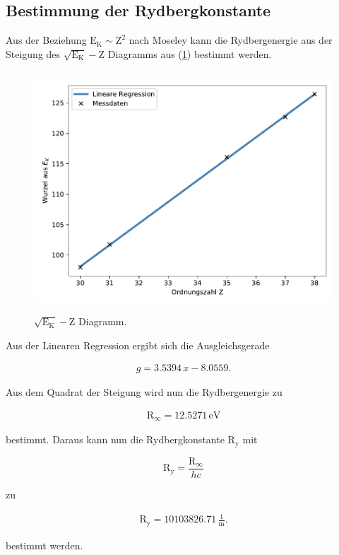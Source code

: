 \subsection{Bestimmung der Rydbergkonstante}    

\noindent
Aus der Beziehung $\text{E}_\text{K} \sim \text{Z}^2$ nach Moseley
kann die Rydbergenergie aus der Steigung des $ \sqrt{\text{E}_\text{K}}-\text{Z}$ Diagramms aus (\ref{fig:mose}) bestimmt werden.

\begin{figure}
    \centering
       \includegraphics[height=9cm]{daten/mose.pdf}
       \caption{$\sqrt{\text{E}_\text{K}}-\text{Z}$ Diagramm.}
       \label{fig:mose}
\end{figure}

\noindent
Aus der Linearen Regression ergibt sich die Ausgleichsgerade

\begin{align*}
    g=3.5394\, x -8.0559.
\end{align*}

\noindent
Aus dem Quadrat der Steigung wird nun die Rydbergenergie zu 

\begin{align*}
    \text{R}_\infty =12.5271 \, \mathrm{eV}
\end{align*}

\noindent
bestimmt.
Daraus kann nun die Rydbergkonstante $\text{R}_\text{y}$ mit

\begin{equation*}
 \text{R}_\text{y}=\frac{\text{R}_\infty}{hc}
\end{equation*}

\noindent
zu 

\begin{align*}
\text{R}_\text{y} =10103826.71 \, \frac{1}{\text{m}}.
\end{align*}

\noindent
bestimmt werden.